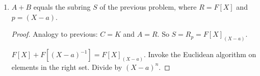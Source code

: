 \documentclass[../psets.tex]{subfiles}
\begin{document}
\begin{enumerate}
\begin{enumerate}
\begin{proof}
            We proceed via a bidirectional inclusion proof.\par
            Suppose first that $c\in F$. Then $c\in F[X]=A$ by definition. Additionally, since $c\in F[T]$ by definition and $\phi(c)=c$ by the definition of $\phi$, we have that $c\in\im(\phi)=B$. Therefore, since $c\in A$ and $c\in B$, $c\in A\cap B$, as desired.\par
            Now suppose that $c\in A\cap B$. Since $c\in A$, we know that $c$ is a polynomial in $X$ with coefficients in $F$. Additionally, by the universal property of the polynomial ring, we know that $\phi=\ev_{(X-a)^{-1}}$. Consequently, $B=\im(\phi)=F[(X-a)^{-1}]$. It follows that if $c$ is the image of any nonconstant polynomial in $F[T]$, $a$ has a nontrivial denominator. But this would contradict our earlier statement that $c\in F[X]$. Thus, $c$ must be the image of some constant. In particular, it follows by the definition of $\phi$ that $c\in F$, as desired.
        \end{proof}
        \item $A+B$ equals the subring $S$ of the previous problem, where $R=F[X]$ and $p=(X-a)$.
        \begin{proof}
            Analogy to previous: $C=K$ and $A=R$. So $S=R_p=F[X]_{(X-a)}$.

            $F[X]+F[(X-a)^{-1}]=F[X]_{(X-a)}$. Invoke the Euclidean algorithm on elements in the right set. Divide by $(X-a)^n$.



\end{proof}
\end{enumerate}
\end{enumerate}
\end{document}
